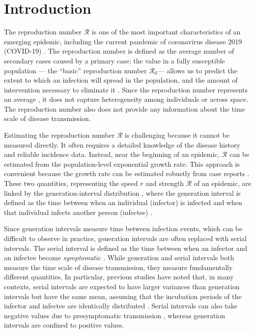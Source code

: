 \documentclass[12pt]{article}
\newcommand{\Rx}[1]{\ensuremath{{\mathcal R}_{#1}}\xspace}
\newcommand{\Ro}{\Rx{0}}
\newcommand{\RR}{\ensuremath{{\mathcal R}}\xspace}
\begin{document}
\pagebreak

\section{Introduction}

The reproduction number \RR is one of the most important characteristics of an emerging epidemic, including the current pandemic of coronavirus disease 2019 (COVID-19) \citep{majumder2020early}.
The reproduction number is defined as the average number of secondary cases caused by a primary case;
the value in a fully susceptible population --- the ``basic'' reproduction number \Ro --- allows us to predict the extent to which an infection will spread in the population, and the amount of intervention necessary to eliminate it \citep{anderson1991infectious}.
Since the reproduction number represents an average \citep{diekmann1990definition, anderson1991infectious}, it does not capture heterogeneity among individuals or across space.
The reproduction number also does not provide any information about the time scale of disease transmission.

Estimating the reproduction number \RR is challenging because it cannot be measured directly.
It often requires a detailed knowledge of the disease history and reliable incidence data.
Instead, near the beginning of an epidemic, \RR can be estimated from the population-level exponential growth rate.
This approach is convenient because the growth rate can be estimated robustly from case reports \citep{mills2004transmissibility, ma2014estimating}.
These two quantities, representing the speed $r$ and strength $\RR$ of an epidemic, are linked by the generation-interval distribution \cite{wallinga2007generation}, where the generation interval is defined as the time between when an individual (infector) is infected and when that individual infects another person (infectee) \citep{svensson2007note}.

Since generation intervals measure time between infection events, which can be difficult to observe in practice, generation intervals are often replaced with serial intervals.
The serial interval is defined as the time between when an infector and an infectee become \emph{symptomatic} \citep{svensson2007note}.
While generation and serial intervals both measure the time scale of disease transmission, they measure fundamentally different quantities. 
In particular, previous studies have noted that, in many contexts, serial intervals are expected to have larger variances than generation intervals but have the same mean, assuming that the incubation periods of the infector and infectee are identically distributed \citep{svensson2007note,klinkenberg2011correlation,te2013estimating,champredon2018equivalence}.
Serial intervals can also take negative values due to presymptomatic transmission \citep{he2020temporal}, whereas generation intervals are confined to positive values.
\end{document}
